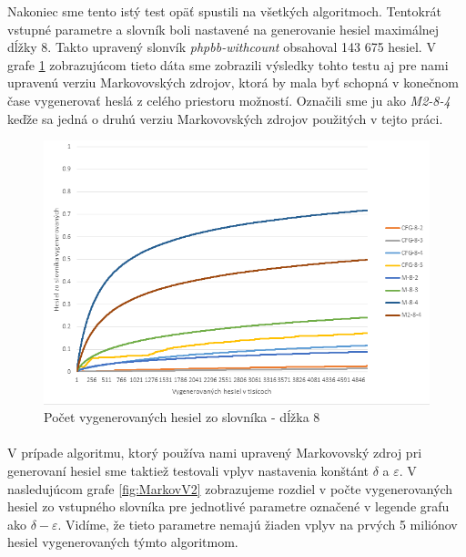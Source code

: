 Nakoniec sme tento istý test opäť spustili na všetkých algoritmoch. Tentokrát vstupné parametre a slovník boli nastavené na generovanie hesiel maximálnej dĺžky 8. Takto upravený slonvík \emph{phpbb-withcount} obsahoval 143 675 hesiel. V grafe \ref{fig:Acc8} zobrazujúcom tieto dáta sme zobrazili výsledky tohto testu aj pre nami upravenú verziu Markovovských zdrojov, ktorá by mala byť schopná v konečnom čase vygenerovať heslá z celého priestoru možností. Označili sme ju ako \emph{M2-8-4} keďže sa jedná o druhú verziu Markovovských zdrojov použitých v tejto práci.

\begin{figure}[ht]
    \centering
    \includegraphics[width=1\textwidth]{sameDictAcc8}
    \caption{Počet vygenerovaných hesiel zo slovníka - dĺžka 8}
    \label{fig:Acc8}
\end{figure}

\paragraph{}
V prípade algoritmu, ktorý používa nami upravený Markovovský zdroj pri generovaní hesiel sme taktiež testovali vplyv nastavenia konštánt \(\delta\) a \(\varepsilon\). V nasledujúcom grafe \ref{fig:MarkovV2} zobrazujeme rozdiel v počte vygenerovaných hesiel zo vstupného slovníka pre jednotlivé parametre označené v legende grafu ako \(\delta-\varepsilon\). Vidíme, že tieto parametre nemajú žiaden vplyv na prvých 5 miliónov hesiel vygenerovaných týmto algoritmom.

